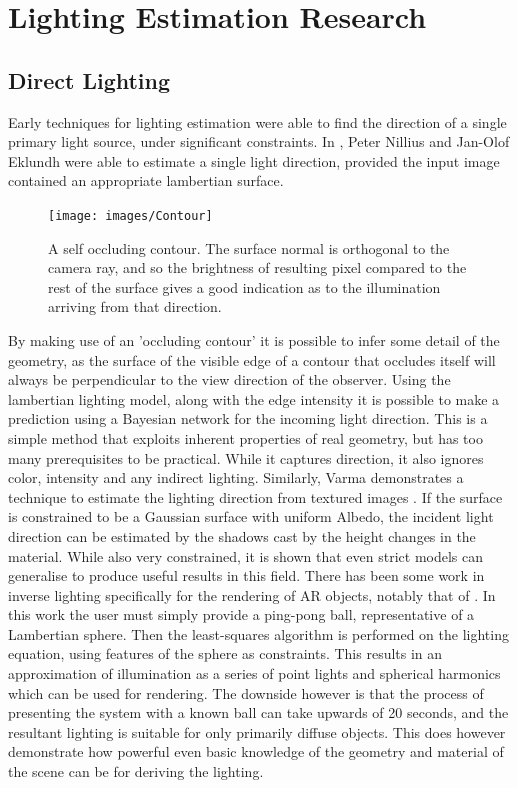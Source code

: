 \documentclass[ %
                    author={Gavin Parker},
                supervisor={Dr. Neill Campbell},
                    degree={MEng},
                     title={Deep Siamese Networks for Illumination Estimation from Stereo Images},
                  subtitle={},
                      type={Research},
                      year={2018} ]{dissertation}
\begin{document}
\section{Lighting Estimation Research}
\subsection{Direct Lighting}
Early techniques for lighting estimation were able to find the direction of a single primary light source, under significant constraints. In \cite{990650}, Peter Nillius and Jan-Olof Eklundh were able to estimate a single light direction, provided the input image contained an appropriate lambertian surface.
\begin{figure}
\texttt{[image: images/Contour]}
\centering
\caption{A self occluding contour. The surface normal is orthogonal to the camera ray, and so the brightness of resulting pixel compared to the rest of the surface gives a good indication as to the illumination arriving from that direction.}
\end{figure}
By making use of an 'occluding contour' it is possible to infer some detail of the geometry, as the surface of the visible edge of a contour that occludes itself will always be perpendicular to the view direction of the observer. Using the lambertian lighting model, along with the edge intensity it is possible to make a prediction using a Bayesian network for the incoming light direction. This is a simple method that exploits inherent properties of real geometry, but has too many prerequisites to be practical. While it captures direction, it also ignores color, intensity and any indirect lighting. Similarly, Varma demonstrates a technique to estimate the lighting direction from textured images \cite{1315030}. If the surface is constrained to be a Gaussian surface with uniform Albedo, the incident light direction can be estimated by the shadows cast by the height changes in the material. While also very constrained, it is shown that even strict models can generalise to produce useful results in this field.
\newline
There has been some work in inverse lighting specifically for the rendering of AR objects, notably that of \cite{Aittala2010}. In this work the user must simply provide a ping-pong ball, representative of a Lambertian sphere. Then the least-squares algorithm is performed on the lighting equation, using features of the sphere as constraints. This results in an approximation of illumination as a series of point lights and spherical harmonics which can be used for rendering. The downside however is that the process of presenting the system with a known ball can take upwards of 20 seconds, and the resultant lighting is suitable for only primarily diffuse objects. This does however demonstrate how powerful even basic knowledge of the geometry and material of the scene can be for deriving the lighting.
\end{document}
